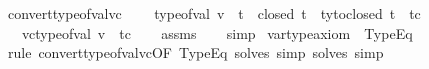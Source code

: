 \begin{isabellebody}
\isanewline
{}\isamarkupfalse%
\ convert{\isacharunderscore}{\kern0pt}type{\isacharunderscore}{\kern0pt}of{\isacharunderscore}{\kern0pt}val{\isacharunderscore}{\kern0pt}vc{\isacharcolon}{\kern0pt}\ \isanewline
\ \ \ {\isachardoublequoteopen}type{\isacharunderscore}{\kern0pt}of{\isacharunderscore}{\kern0pt}val\ v\ {\isacharequal}{\kern0pt}\ t{\isachardoublequoteclose}\ \ {\isachardoublequoteopen}closed\ t{\isachardoublequoteclose}\ \ {\isachardoublequoteopen}ty{\isacharunderscore}{\kern0pt}to{\isacharunderscore}{\kern0pt}closed\ t\ {\isacharequal}{\kern0pt}\ tc{\isachardoublequoteclose}\isanewline
\ \ \ {\isachardoublequoteopen}vc{\isacharunderscore}{\kern0pt}type{\isacharunderscore}{\kern0pt}of{\isacharunderscore}{\kern0pt}val\ v\ {\isacharequal}{\kern0pt}\ tc{\isachardoublequoteclose}\isanewline
%
\isadelimproof
\ \ %
\endisadelimproof
%
\isatagproof
{}\isamarkupfalse%
\ assms\isanewline
\ \ \isamarkupfalse%
\ simp%
\endisatagproof
{\isafoldproof}%
%
\isadelimproof
\isanewline
%
\endisadelimproof
\isanewline
{}\isamarkupfalse%
\ var{\isacharunderscore}{\kern0pt}type{\isacharunderscore}{\kern0pt}axiom\ \ TypeEq\ {\isacharequal}{\kern0pt}\ \isanewline
{\isacharparenleft}{\kern0pt}\ {\isacharparenleft}{\kern0pt}rule\ convert{\isacharunderscore}{\kern0pt}type{\isacharunderscore}{\kern0pt}of{\isacharunderscore}{\kern0pt}val{\isacharunderscore}{\kern0pt}vc{\isacharbrackleft}{\kern0pt}OF\ TypeEq{\isacharbrackright}{\kern0pt}{\isacharcomma}{\kern0pt}\ solves\ {\isacartoucheopen}simp{\isacartoucheclose}{\isacharcomma}{\kern0pt}\ solves\ {\isacartoucheopen}simp{\isacartoucheclose}{\isacharparenright}{\kern0pt}{\isacharparenright}{\kern0pt}\isanewline
%
\isadelimtheory
\isanewline
%
\endisadelimtheory
%
\isatagtheory
{}\isamarkupfalse%
%
\endisatagtheory
{\isafoldtheory}%
%
\isadelimtheory
%
\endisadelimtheory
%
\end{isabellebody}%
\endinput
